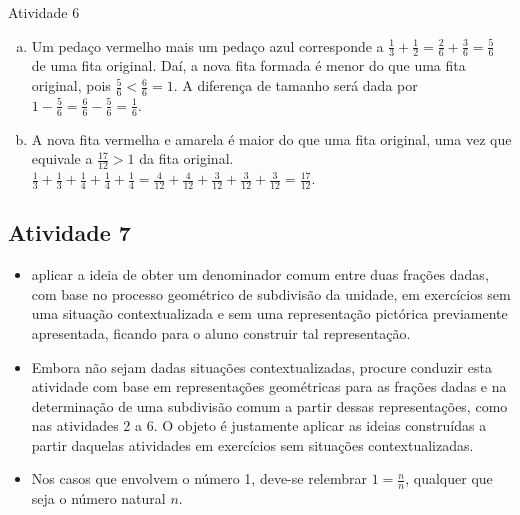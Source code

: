 \begin{multicols}{2}
\begin{resposta*}{Atividade 6}
\begin{enumerate}[a)]
   \item Um pedaço vermelho mais um pedaço azul corresponde a $\frac{1}{3} + \frac{1}{2} = \frac{2}{6}+ \frac{3}{6} = \frac{5}{6}$ de uma fita original. Daí, a nova fita formada é menor do que uma fita original, pois $\frac{5}{6}<\frac{6}{6}=1$. A diferença de tamanho será dada por $1- \frac{5}{6} = \frac{6}{6} - \frac{5}{6} = \frac{1}{6}$.
   \item A nova fita vermelha e amarela é maior do que uma fita original, uma vez que equivale a $\frac{17}{12}>1$ da fita original.
$\frac{1}{3}+\frac{1}{3}+\frac{1}{4}+\frac{1}{4}+\frac{1}{4} = \frac{4}{12}+\frac{4}{12}+\frac{3}{12}+\frac{3}{12}+\frac{3}{12} = \frac{17}{12}$.
  \end{enumerate}
\end{resposta*}

\subsection{Atividade 7}

  \newline \vspace{.15cm}

  \begin{itemize} %
    \item       aplicar a ideia de obter um denominador comum entre duas frações dadas, com base no processo geométrico de subdivisão da unidade, em exercícios sem uma situação contextualizada e sem uma representação pictórica  previamente apresentada, ficando para o aluno construir tal representação.
 \end{itemize} %


   \vspace{.15cm}

  \begin{itemize} %
    \item       Embora não sejam dadas situações contextualizadas, procure conduzir esta atividade com base em representações geométricas para as frações dadas e na determinação de uma subdivisão comum a partir dessas representações, como nas atividades 2 a 6. O objeto é justamente aplicar as ideias construídas a partir daquelas atividades em exercícios sem situações contextualizadas.
    \item  Nos casos que envolvem o número 1, deve-se relembrar   $1 = \frac{n}{n}$, qualquer que seja o número natural $n$.
  \end{itemize} %


\end{multicols}
